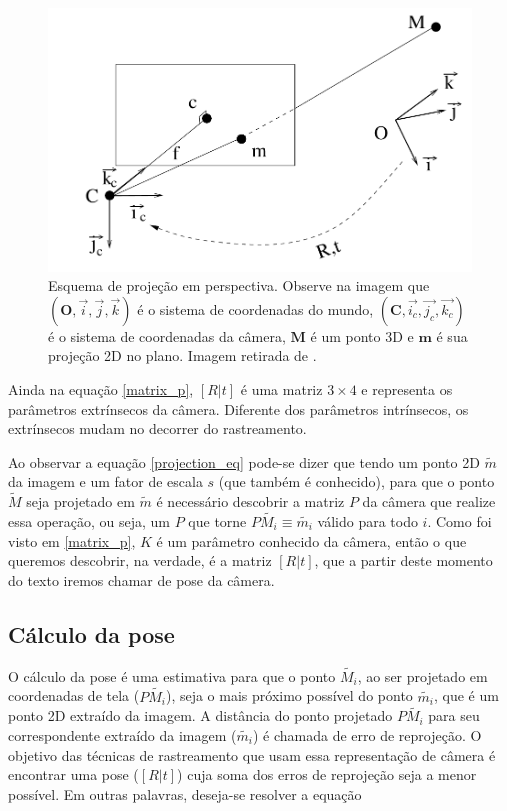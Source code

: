 \begin{figure}[!ht]
\centering\includegraphics[width=5in]{monografia/projection_scheme.png}
\caption{Esquema de projeção em perspectiva. Observe na imagem que $(\mathbf{O}, \vec{i}, \vec{j}, \vec{k})$ é o sistema de coordenadas do mundo, $(\mathbf{C}, \vec{i_c}, \vec{j_c}, \vec{k_c})$ é o sistema de coordenadas da câmera, $\mathbf{M}$ é um ponto 3D e $\mathbf{m}$ é sua projeção 2D no plano. Imagem retirada de \cite{lepetit}.}
\label{projection_scheme}
\end{figure}

Ainda na equação \eqref{matrix_p}, $[R | t]$ é uma matriz $3 \times 4$ e representa os parâmetros extrínsecos da câmera. Diferente dos parâmetros intrínsecos, os extrínsecos mudam no decorrer do rastreamento.

Ao observar a equação \eqref{projection_eq} pode-se dizer que tendo um ponto 2D $\tilde{m}$ da imagem e um fator de escala $s$ (que também é conhecido), para que o ponto $\tilde{M}$ seja projetado em $\tilde{m}$ é necessário descobrir a matriz $P$ da câmera que realize essa operação, ou seja, um $P$ que torne $P\tilde{M_i} \equiv \tilde{m_i}$ válido para todo $i$. Como foi visto em \eqref{matrix_p}, $K$ é um parâmetro conhecido da câmera, então o que queremos descobrir, na verdade, é a matriz $[R | t]$, que a partir deste momento do texto iremos chamar de pose da câmera.

\subsection{Cálculo da pose}

O cálculo da pose é uma estimativa para que o ponto $\tilde{M_i}$, ao ser projetado em coordenadas de tela ($P\tilde{M_i}$), seja o mais próximo possível do ponto $\tilde{m_i}$, que é um ponto 2D extraído da imagem. A distância do ponto projetado $P\tilde{M_i}$ para seu correspondente extraído da imagem ($\tilde{m_i}$) é chamada de erro de reprojeção. O objetivo das técnicas de rastreamento que usam essa representação de câmera é encontrar uma pose ($[R | t]$) cuja soma dos erros de reprojeção seja a menor possível. Em outras palavras, deseja-se resolver a equação

